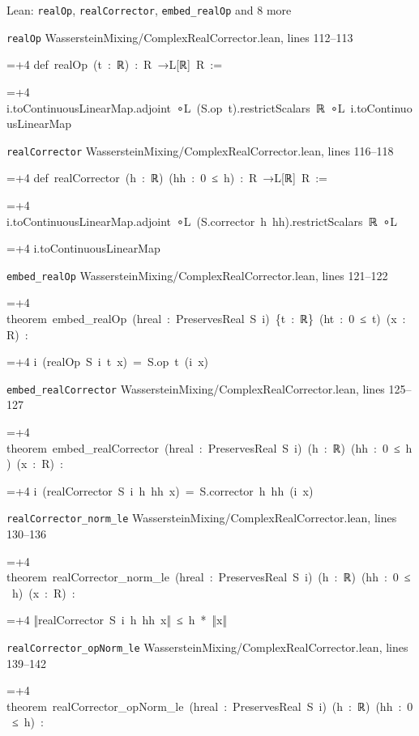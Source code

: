 \documentclass[11pt,a4paper]{report}
\newlength{\leancharwidth}
\newenvironment{leancode}{\par\smallskip\begingroup\ttfamily\footnotesize\raggedright
  \settowidth{\leancharwidth}{M}\setlength{\parskip}{0pt}\setlength{\parindent}{0pt}
  \frenchspacing}{\par\endgroup\smallskip}
\newcommand{\leanline}[2]{\hangindent=\dimexpr#1\leancharwidth+4\leancharwidth\relax
  \hangafter=1\noindent\hspace*{#1\leancharwidth}#2\par}
\newcommand{\leansource}[1]{\par{\footnotesize\color{leanmuted}#1}\par}
\begin{document}
\begin{leanbox}{Lean: \texttt{realOp}, \texttt{realCorrector}, \texttt{embed\_\allowbreak{}realOp} and 8 more}
\leansource{\texttt{realOp} \quad WassersteinMixing/\allowbreak{}ComplexRealCorrector.lean, lines 112–113}
\begin{leancode}
\leanline{0}{def\ realOp\ (t\ :\ ℝ)\ :\ R\ →L[ℝ]\ R\ :=}
\leanline{2}{i.toContinuousLinearMap.adjoint\ ∘L\ (S.op\ t).restrictScalars\ ℝ\ ∘L\ i.toContinuousLinearMap}
\end{leancode}
\leansource{\texttt{realCorrector} \quad WassersteinMixing/\allowbreak{}ComplexRealCorrector.lean, lines 116–118}
\begin{leancode}
\leanline{0}{def\ realCorrector\ (h\ :\ ℝ)\ (hh\ :\ 0\ ≤\ h)\ :\ R\ →L[ℝ]\ R\ :=}
\leanline{2}{i.toContinuousLinearMap.adjoint\ ∘L\ (S.corrector\ h\ hh).restrictScalars\ ℝ\ ∘L}
\leanline{4}{i.toContinuousLinearMap}
\end{leancode}
\leansource{\texttt{embed\_\allowbreak{}realOp} \quad WassersteinMixing/\allowbreak{}ComplexRealCorrector.lean, lines 121–122}
\begin{leancode}
\leanline{0}{theorem\ embed\_realOp\ (hreal\ :\ PreservesReal\ S\ i)\ \{t\ :\ ℝ\}\ (ht\ :\ 0\ ≤\ t)\ (x\ :\ R)\ :}
\leanline{4}{i\ (realOp\ S\ i\ t\ x)\ =\ S.op\ t\ (i\ x)}
\end{leancode}
\leansource{\texttt{embed\_\allowbreak{}realCorrector} \quad WassersteinMixing/\allowbreak{}ComplexRealCorrector.lean, lines 125–127}
\begin{leancode}
\leanline{0}{theorem\ embed\_realCorrector\ (hreal\ :\ PreservesReal\ S\ i)\ (h\ :\ ℝ)\ (hh\ :\ 0\ ≤\ h)\ (x\ :\ R)\ :}
\leanline{4}{i\ (realCorrector\ S\ i\ h\ hh\ x)\ =\ S.corrector\ h\ hh\ (i\ x)}
\end{leancode}
\leansource{\texttt{realCorrector\_\allowbreak{}norm\_\allowbreak{}le} \quad WassersteinMixing/\allowbreak{}ComplexRealCorrector.lean, lines 130–136}
\begin{leancode}
\leanline{0}{theorem\ realCorrector\_norm\_le\ (hreal\ :\ PreservesReal\ S\ i)\ (h\ :\ ℝ)\ (hh\ :\ 0\ ≤\ h)\ (x\ :\ R)\ :}
\leanline{4}{‖realCorrector\ S\ i\ h\ hh\ x‖\ ≤\ h\ *\ ‖x‖}
\end{leancode}
\leansource{\texttt{realCorrector\_\allowbreak{}opNorm\_\allowbreak{}le} \quad WassersteinMixing/\allowbreak{}ComplexRealCorrector.lean, lines 139–142}
\begin{leancode}
\leanline{0}{theorem\ realCorrector\_opNorm\_le\ (hreal\ :\ PreservesReal\ S\ i)\ (h\ :\ ℝ)\ (hh\ :\ 0\ ≤\ h)\ :}

\end{leancode}
\end{leanbox}
\end{document}
